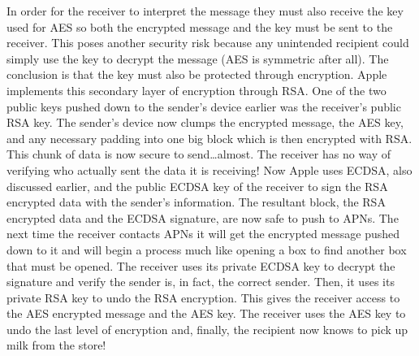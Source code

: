In order for the receiver to interpret the message they must also receive the
key used for AES so both the encrypted message and the key must be sent to the
receiver.  This poses another security risk because any unintended recipient
could simply use the key to decrypt the message (AES is symmetric after all).
The conclusion is that the key must also be protected through encryption.
Apple implements this secondary layer of encryption through RSA\cite{apple}.  One of the
two public keys pushed down to the sender's device earlier was the receiver's
public RSA key.  The sender's device now clumps the encrypted message, the AES
key, and any necessary padding into one big block which is then encrypted with
RSA\cite{quarkslab}.  This chunk of data is now secure to send\ldots almost.  The receiver has
no way of verifying who actually sent the data it is receiving!  Now Apple uses
ECDSA, also discussed earlier, and the public ECDSA key of the receiver to sign
the RSA encrypted data with the sender's information\cite{apple}.  The resultant block, the
RSA encrypted data and the ECDSA signature, are now safe to push to APNs.  The
next time the receiver contacts APNs it will get the encrypted message pushed
down to it and will begin a process much like opening a box to find another box
that must be opened.  The receiver uses its private ECDSA key to decrypt the
signature and verify the sender is, in fact, the correct sender.  Then, it uses
its private RSA key to undo the RSA encryption.  This gives the receiver access
to the AES encrypted message and the AES key.  The receiver uses the AES key to
undo the last level of encryption and, finally, the recipient now knows to pick
up milk from the store!
